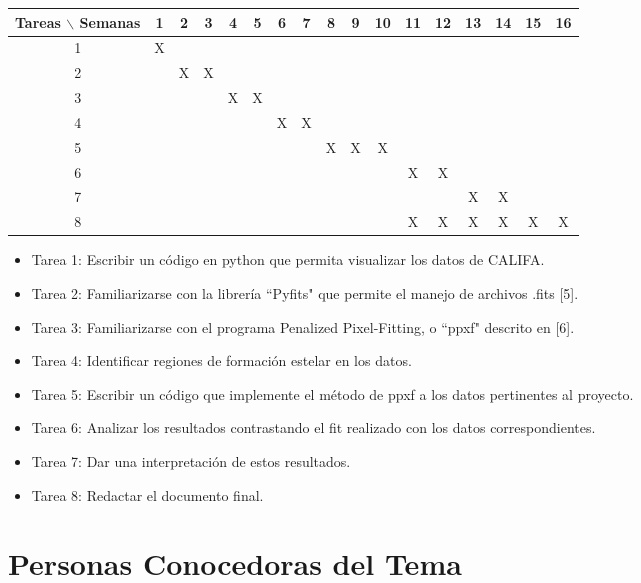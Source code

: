 \documentclass[12pt]{article}
\begin{document}
\begin{table}[htb]
	\begin{tabular}{|c|cccccccccccccccc| }
	\hline
	Tareas $\backslash$ Semanas & 1 & 2 & 3 & 4 & 5 & 6 & 7 & 8 & 9 & 10 & 11 & 12 & 13 & 14 & 15 & 16  \\
	\hline
	1 & X &   &   &   &   &   &   &   &   &   &   &   &   &   &   &   \\
	2 &   & X & X &   &   &   &   &   &   &   &   &   &   &   &   &   \\
	3 &   &   &   & X & X &   &   &   &   &   &   &   &   &   &   &   \\
	4 &   &   &   &   &   & X & X &   &   &   &   &   &   &   &   &   \\
	5 &   &   &   &   &   &   &   & X & X & X &   &   &   &   &   &   \\
	6 &   &   &   &   &   &   &   &   &   &   & X & X &   &   &   &   \\
	7 &   &   &   &   &   &   &   &   &   &   &   &   & X & X &   &   \\
	8 &   &   &   &   &   &   &   &   &   &   & X & X & X & X & X & X \\
	\hline
	\end{tabular}
\end{table}
\vspace{1mm}

\begin{itemize}
    \item Tarea 1: Escribir un c\'odigo en python que permita visualizar los datos de CALIFA.
    \item Tarea 2: Familiarizarse con la librer\'ia ``Pyfits" que permite el manejo de archivos .fits [5].
	\item Tarea 3: Familiarizarse con el programa Penalized Pixel-Fitting, o ``ppxf" descrito en [6]. 
	\item Tarea 4: Identificar regiones de formaci\'on estelar en los datos.
    \item Tarea 5: Escribir un c\'odigo que implemente el m\'etodo de ppxf a los datos pertinentes al proyecto.
	\item Tarea 6: Analizar los resultados contrastando el fit realizado con los datos correspondientes.
	\item Tarea 7: Dar una interpretaci\'on de estos resultados.
	
	\item Tarea 8: Redactar el documento final.
\end{itemize}

\section{Personas Conocedoras del Tema}
\end{document}
